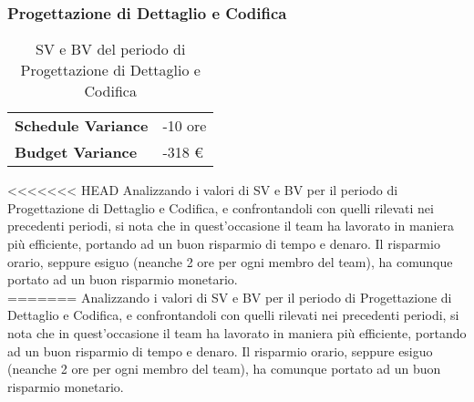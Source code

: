 \subsubsection{Progettazione di Dettaglio e Codifica}
\begin{table}[H]
\centering
\begin{tabular}{|l|l|}
\cline{1-2}
\textbf{Schedule Variance} & -10 ore \\ \cline{1-2}
\textbf{Budget Variance} & -318 \euro{} \\ \cline{1-2}
\end{tabular}
\caption{SV e BV del periodo di Progettazione di Dettaglio e Codifica}
\end{table}
<<<<<<< HEAD
Analizzando i valori di SV e BV per il periodo di Progettazione di Dettaglio e Codifica, e confrontandoli con quelli rilevati nei precedenti periodi, si nota che in quest'occasione il team ha lavorato in maniera più efficiente, portando ad un buon risparmio di tempo e denaro. Il risparmio orario, seppure esiguo (neanche 2 ore per ogni membro del team), ha comunque portato ad un buon risparmio monetario. \\
=======
Analizzando i valori di SV e BV per il periodo di Progettazione di Dettaglio e Codifica, e confrontandoli con quelli rilevati nei precedenti periodi, si nota che in quest'occasione il team ha lavorato in maniera più efficiente, portando ad un buon risparmio di tempo e denaro. Il risparmio orario, seppure esiguo (neanche 2 ore per ogni membro del team), ha comunque portato ad un buon risparmio monetario. \\
